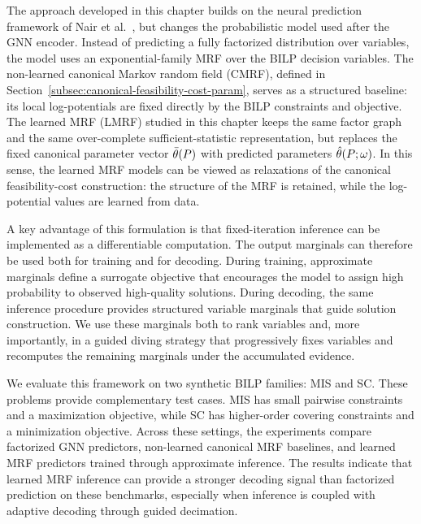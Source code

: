 The approach developed in this chapter builds on the neural prediction framework of Nair et al.~\cite{nair_solving_2020}, but changes the probabilistic model used after the GNN encoder. Instead of predicting a fully factorized distribution over variables, the model uses an exponential-family MRF over the BILP decision variables. The non-learned canonical Markov random field (CMRF), defined in Section~\ref{subsec:canonical-feasibility-cost-param}, serves as a structured baseline: its local log-potentials are fixed directly by the BILP constraints and objective. The learned MRF (LMRF) studied in this chapter keeps the same factor graph and the same over-complete sufficient-statistic representation, but replaces the fixed canonical parameter vector $\bar{\theta}(P)$ with predicted parameters $\hat{\theta}(P;\omega)$. In this sense, the learned MRF models can be viewed as relaxations of the canonical feasibility-cost construction: the structure of the MRF is retained, while the log-potential values are learned from data.

A key advantage of this formulation is that fixed-iteration inference can be implemented as a differentiable computation. The output marginals can
therefore be used both for training and for decoding. During training, approximate marginals define a surrogate objective that encourages the model
to assign high probability to observed high-quality solutions. During decoding, the same inference procedure provides structured variable marginals that guide solution construction. We use these marginals both to rank variables and, more importantly, in a guided diving strategy that progressively fixes variables and recomputes the remaining marginals under the accumulated evidence.

We evaluate this framework on two synthetic BILP families: MIS and SC. These problems provide complementary test cases. MIS has small pairwise constraints and a maximization objective, while SC has higher-order covering constraints and a minimization objective. Across these settings, the experiments compare factorized GNN predictors, non-learned canonical MRF baselines, and learned MRF predictors trained through approximate inference. The results indicate that learned MRF inference can provide a stronger decoding signal than factorized prediction on these benchmarks, especially when inference is coupled with adaptive decoding through guided decimation.


